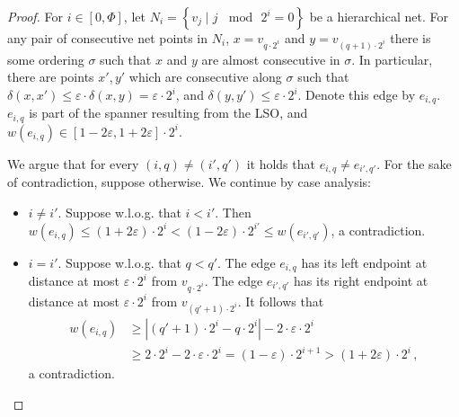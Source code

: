 \documentclass[11pt]{article}
\def\eps{\varepsilon}
\begin{document}
\begin{proof}
For $i\in[0,\Phi]$, let $N_{i}=\left\{ v_{j}\mid j\,\mod\,2^{i}=0\right\} $
be a hierarchical net. For any pair of consecutive net points in $N_{i}$,
$x=v_{q\cdot2^{i}}$ and $y=v_{(q+1)\cdot2^{i}}$ there is some ordering
$\sigma$ such that $x$ and $y$ are almost consecutive in $\sigma$.
In particular, there are points $x',y'$ which are consecutive along
$\sigma$ such that $\delta(x,x')\le\eps\cdot\delta(x,y)=\eps\cdot2^{i}$,
and $\delta(y,y')\le\eps\cdot2^{i}$. Denote this edge by $e_{i,q}$.
$e_{i,q}$ is part of the spanner resulting from the LSO, and $w(e_{i,q})\in\left[1-2\eps,1+2\eps\right]\cdot2^{i}$. 

We argue that for every $(i,q)\ne(i',q')$ it holds that $e_{i,q}\ne e_{i',q'}$.
For the sake of contradiction, suppose otherwise. We continue by case
analysis:
\begin{itemize}
\item $i\ne i'$. Suppose w.l.o.g. that $i<i'$. Then $w(e_{i,q})\le(1+2\eps)\cdot2^{i}<(1-2\eps)\cdot2^{i'}\le w(e_{i',q'})$,
a contradiction.
\item $i=i'$. Suppose w.l.o.g. that $q<q'$. The edge $e_{i,q}$ has its
left endpoint at distance at most $\eps\cdot2^{i}$ from $v_{q\cdot2^{i}}$.
The edge $e_{i',q'}$ has its right endpoint at distance at most $\eps\cdot2^{i}$
from $v_{(q'+1)\cdot2^{i}}$. It follows that 
\begin{align*}
w(e_{i,q}) & \ge\left|(q'+1)\cdot2^{i}-q\cdot2^{i}\right|-2\cdot\eps\cdot2^{i}\\
 & \ge2\cdot2^{i}-2\cdot\eps\cdot2^{i}=(1-\eps)\cdot2^{i+1}>(1+2\eps)\cdot2^{i}\,,
\end{align*}
a contradiction.\aftermath
\end{itemize}
\end{proof}
\end{document}
